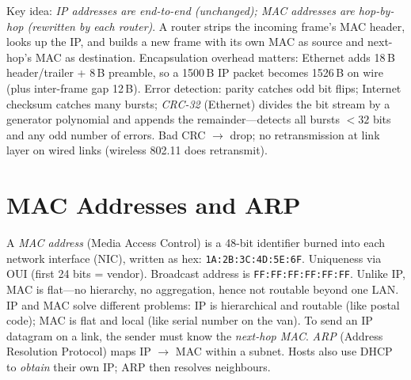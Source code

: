 Key idea: \emph{IP addresses are end-to-end (unchanged); MAC addresses are hop-by-hop (rewritten by each router)}. A router strips the incoming frame's MAC header, looks up the IP, and builds a new frame with its own MAC as source and next-hop's MAC as destination. Encapsulation overhead matters: Ethernet adds 18\,B header/trailer + 8\,B preamble, so a 1500\,B IP packet becomes 1526\,B on wire (plus inter-frame gap 12\,B).
Error detection: parity catches odd bit flips; Internet checksum catches many bursts; \emph{CRC-32} (Ethernet) divides the bit stream by a generator polynomial and appends the remainder---detects all bursts $<32$ bits and any odd number of errors. Bad CRC $\to$ drop; no retransmission at link layer on wired links (wireless 802.11 does retransmit).
\section{MAC Addresses and ARP}\label{sec:mac-arp}
A \emph{MAC address} (Media Access Control) is a 48-bit identifier burned into each network interface (NIC), written as hex: \texttt{1A:2B:3C:4D:5E:6F}. Uniqueness via OUI (first 24 bits = vendor). Broadcast address is \texttt{FF:FF:FF:FF:FF:FF}. Unlike IP, MAC is flat---no hierarchy, no aggregation, hence not routable beyond one LAN.
IP and MAC solve different problems: IP is hierarchical and routable (like postal code); MAC is flat and local (like serial number on the van). To send an IP datagram on a link, the sender must know the \emph{next-hop MAC}.
\emph{ARP} (Address Resolution Protocol) maps IP $\to$ MAC within a subnet. Hosts also use DHCP to \emph{obtain} their own IP; ARP then resolves neighbours.
